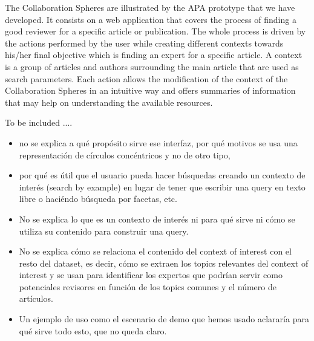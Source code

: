 The Collaboration Spheres are illustrated by the APA prototype that we have developed. It consists on a web application that covers the process of finding a good reviewer for a specific article or publication. The whole process is driven by the actions performed by the user while creating different contexts towards his/her final objective which is finding an expert for a specific article. A context is a group of articles and authors surrounding the main article that are used as search parameters. Each action allows the modification of the context of the Collaboration Spheres in an intuitive way and offers summaries of information that may help on understanding the available resources.

To be included ....

\begin{itemize}
\item no se explica a qué propósito sirve ese interfaz, por qué motivos se usa una representación de círculos concéntricos y no de otro tipo,
\item por qué es útil que el usuario pueda hacer búsquedas creando un contexto de interés (search by example) en lugar de tener que escribir una query en texto libre o haciéndo búsqueda por facetas, etc.
\item No se explica lo que es un contexto de interés ni para qué sirve ni cómo se utiliza su contenido para construir una query.
\item No se explica cómo se relaciona el contenido del context of interest con el resto del dataset, es decir, cómo se extraen los topics relevantes del context of interest y se usan para identificar los expertos que podrían servir como potenciales revisores en función de los  topics comunes y el número de artículos.
\item Un ejemplo de uso como el escenario de demo que hemos usado aclararía para qué sirve todo esto, que no queda claro.
\end{itemize}



